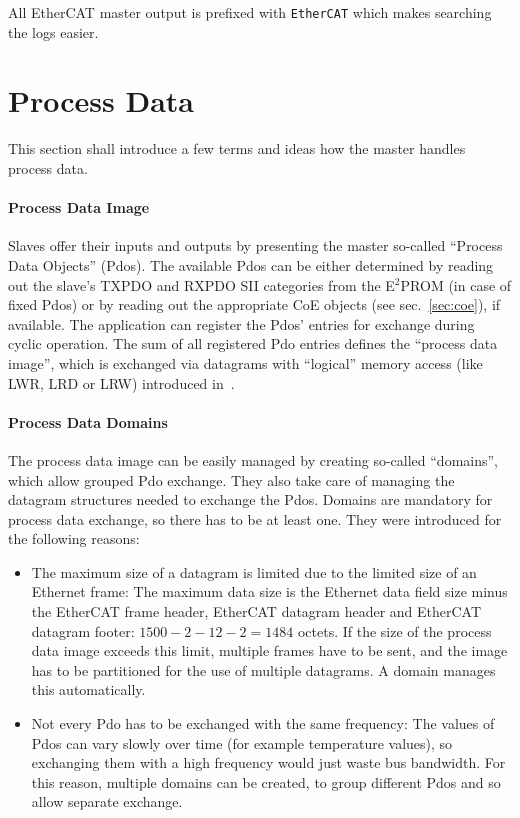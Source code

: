 \documentclass[a4paper,12pt,BCOR6mm,bibtotoc,idxtotoc]{scrbook}
\begin{document}
All EtherCAT master output is prefixed with \lstinline+EtherCAT+ which makes
searching the logs easier.


\section{Process Data}
\label{sec:processdata}

This section shall introduce a few terms and ideas how the master handles
process data.

\paragraph{Process Data Image}

Slaves offer their inputs and outputs by presenting the master so-called
``Process Data Objects'' (Pdos). The available Pdos can be either
determined by reading out the slave's TXPDO and RXPDO SII categories from the
E$^2$PROM (in case of fixed Pdos) or by reading out the appropriate CoE
objects (see sec.~\ref{sec:coe}), if available.  The application can register
the Pdos' entries for exchange during cyclic operation. The sum of all
registered Pdo entries defines the ``process data image'', which is exchanged
via datagrams with ``logical'' memory access (like LWR, LRD or LRW) introduced
in~\cite[sec.~5.4]{dlspec}.

\paragraph{Process Data Domains}

The process data image can be easily managed by creating so-called
``domains'', which allow grouped Pdo exchange. They also take care of managing
the datagram structures needed to exchange the Pdos. Domains are mandatory for
process data exchange, so there has to be at least one. They were introduced
for the following reasons:

\begin{itemize}

\item The maximum size of a datagram is limited due to the limited size of an
Ethernet frame: The maximum data size is the Ethernet data field size minus
the EtherCAT frame header, EtherCAT datagram header and EtherCAT datagram
footer: $1500 - 2 - 12 - 2 = 1484$ octets. If the size of the process data
image exceeds this limit, multiple frames have to be sent, and the image has
to be partitioned for the use of multiple datagrams. A domain manages this
automatically.

\item Not every Pdo has to be exchanged with the same frequency: The values of
Pdos can vary slowly over time (for example temperature values), so exchanging
them with a high frequency would just waste bus bandwidth. For this reason,
multiple domains can be created, to group different Pdos and so allow separate
exchange.

\end{itemize}
\end{document}
